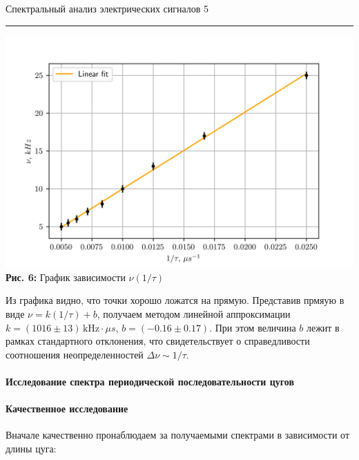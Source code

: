 \documentclass[12pt,a4paper]{scrartcl}
\begin{document}
	\newpage
	
	
	\begin{flushleft}
		\footnotesize{Спектральный анализ электрических сигналов} \hspace{\fill} \footnotesize{5}
		\\[-0.3cm]\noindent\rule{\textwidth}{0.3pt}
	\end{flushleft}
	
	\begin{center}
		\includegraphics[scale=1]{PIC_6.png}
		\\\textbf{Рис. 6:} График зависимости $\nu(1/\tau)$
	\end{center}
	
 	Из графика видно, что точки хорошо ложатся на прямую. Представив прмяую в виде $\nu = k(1/\tau) + b$, получаем методом линейной аппроксимации $k = (1016 \pm 13)\, \text{kHz} \cdot \mu s$, $b = (-0.16 \pm 0.17)$. При этом величина $b$ лежит в рамках стандартного отклонения, что свидетельствует о справедливости соотношения неопределенностей $\Delta \nu \sim 1/\tau$.
	
	\paragraph{Исследование спектра периодической последовательности цугов} \hfill
	
	\paragraph{Качественное исследование} \hfill
	
	Вначале качественно пронаблюдаем за получаемыми спектрами в зависимости от длины цуга:
	
\end{document}
